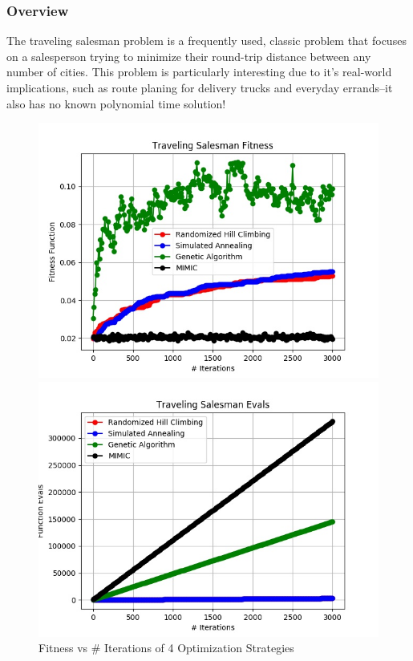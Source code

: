 \documentclass[h]{article}
\begin{document}
\subsubsection*{Overview}
The traveling salesman problem is a frequently used, classic problem that focuses on a 
salesperson trying to minimize their round-trip distance between any number of cities.  This problem is particularly 
interesting  due to it's real-world implications, such as route planing for 
delivery trucks and everyday errands--it also has no known polynomial time 
solution!

 \begin{figure}[H]
      \includegraphics[width=1\textwidth,keepaspectratio]{traveling_salesman_fitness.jpg} 
      \caption*{Fitness vs # Iterations of 4 Optimization Strategies} 
   \endminipage\hfill
      \includegraphics[width=1\textwidth,keepaspectratio]{traveling_salesman_evals.jpg} 

\end{figure}
\end{document}
